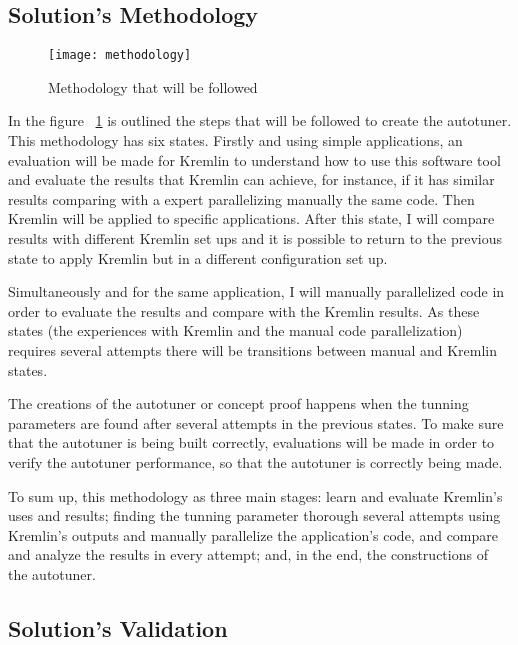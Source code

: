 \subsection{Solution's Methodology}
\begin{figure}[t]
  \begin{center}
    \leavevmode
    \texttt{[image: methodology]}
    \caption{Methodology that will be followed}
    \label{fig:method}
  \end{center}
\end{figure}

In the  figure ~\ref{fig:method} is outlined the steps that will be followed to create the autotuner. This methodology has six states. Firstly and using simple applications, an evaluation will be made for Kremlin to understand how to use this software tool and evaluate the results that Kremlin can achieve, for instance, if it has similar results comparing with a expert parallelizing manually the same code. Then Kremlin will be applied to specific applications. After this state, I will compare results with different Kremlin set ups and it is possible to return to the previous state to apply Kremlin but in a different configuration set up.

Simultaneously and for the same application, I will manually parallelized code in order to evaluate the results and compare with the Kremlin results. As these states (the experiences with Kremlin and the manual code parallelization) requires several attempts there will be transitions between manual and Kremlin states. 

The creations of the autotuner or concept proof happens when the tunning parameters are found after several attempts in the previous states. To make sure that the autotuner is being built correctly, evaluations will be made in order to verify the autotuner performance, so that the autotuner is correctly being made.

To sum up, this methodology as three main stages: learn and evaluate  Kremlin's uses and results; finding the tunning parameter thorough several attempts using Kremlin's outputs and manually parallelize the application's code, and compare and analyze the results in every attempt; and, in the end, the constructions of the autotuner.


\subsection{Solution's Validation}

